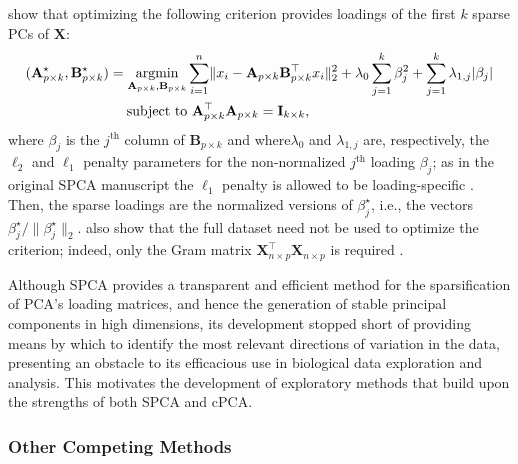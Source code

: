 \citet{Zou2006} show that optimizing the following criterion provides loadings of the first $k$ sparse PCs of $\mathbf{X}$:
\begin{equation}\label{eq:spca}
\begin{aligned}
  (\mathbf{A}^\star_{p \times k}, \mathbf{B}^\star_{p \times k}) & =
    \operatorname*{argmin}_{\mathbf{A}_{p \times k}, \mathbf{B}_{p \times k}}
    \sum_{i=1}^n \lVert x_i - \mathbf{A}_{p \times k}\mathbf{B}_{p \times k}^\top x_i \rVert_2^2 +
    \lambda_0 \sum_{j=1}^k\beta_j^2 +
    \sum_{j=1}^k\lambda_{1,j} \lvert \beta_j \rvert \\
  & \quad \; \text{subject to }\mathbf{A}_{p \times k}^\top\mathbf{A}_{p \times k} = \mathbf{I}_{k \times k},
\end{aligned}
\end{equation}
where $\beta_j$ is the $j^{\text{th}}$ column of $\mathbf{B}_{p \times k}$ and where$\lambda_0$ and $\lambda_{1,j}$ are, respectively, the $\ell_2$ and $\ell_1$ penalty parameters for the non-normalized $j^{\text{th}}$  loading $\beta_j$; as in the original SPCA manuscript the $\ell_1$ penalty is allowed to be loading-specific \cite{Zou2006}. Then, the sparse loadings are the normalized versions of $\beta_j^\star$, i.e., the vectors $\beta_j^\star/\lVert\beta_j^\star\rVert_2$. \citet{Zou2006} also show that the full dataset need not be used to optimize the criterion; indeed, only the Gram matrix $\mathbf{X}_{n \times p}^\top\mathbf{X}_{n \times p}$ is required \cite{Zou2006}. 

Although SPCA provides a transparent and efficient method for the sparsification of PCA's loading matrices, and hence the generation of stable principal components in high dimensions, its development stopped short of providing means by which to identify the most relevant directions of variation in the data, presenting an obstacle to its efficacious use in biological data exploration and analysis. This motivates the development of exploratory methods that build upon the strengths of both SPCA and cPCA.

\subsubsection{Other Competing Methods}\label{others}

